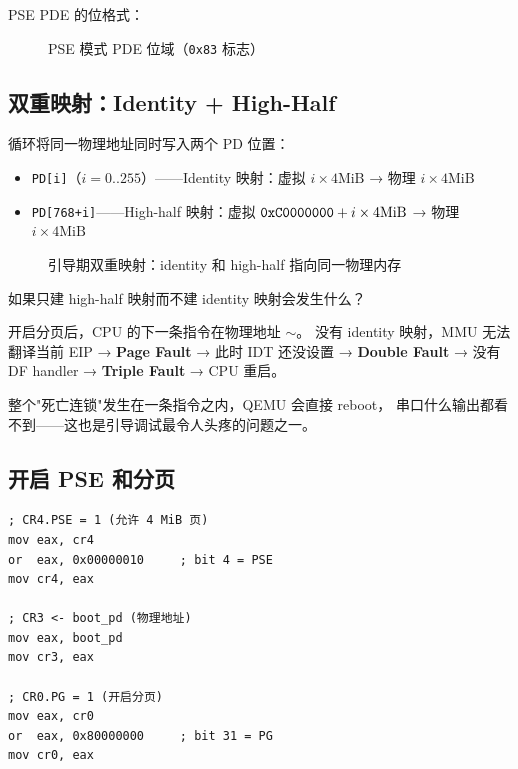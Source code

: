PSE PDE 的位格式：

\begin{figure}[H]
  \centering
  
  \caption{PSE 模式 PDE 位域（\texttt{0x83} 标志）}
  \label{fig:pse-pde-bits}
\end{figure}

\subsection{双重映射：Identity + High-Half}
\label{sec:dual-mapping}

循环将同一物理地址同时写入两个 PD 位置：

\begin{itemize}
  \item \texttt{PD[i]}（$i = 0..255$）——Identity 映射：虚拟 $i \times 4\text{MiB}$ → 物理 $i \times 4\text{MiB}$
  \item \texttt{PD[768+i]}——High-half 映射：虚拟 $\texttt{0xC0000000} + i \times 4\text{MiB}$ → 物理 $i \times 4\text{MiB}$
\end{itemize}

\begin{figure}[H]
  \centering
  
  \caption{引导期双重映射：identity 和 high-half 指向同一物理内存}
  \label{fig:dual-mapping}
\end{figure}

\begin{warnbox}
如果只建 high-half 映射而不建 identity 映射会发生什么？

开启分页后，CPU 的下一条指令在物理地址 $\sim$。
没有 identity 映射，MMU 无法翻译当前 EIP → \textbf{Page Fault} →
此时 IDT 还没设置 → \textbf{Double Fault} →
没有 DF handler → \textbf{Triple Fault} → CPU 重启。

整个"死亡连锁"发生在一条指令之内，QEMU 会直接 reboot，
串口什么输出都看不到——这也是引导调试最令人头疼的问题之一。
\end{warnbox}

\subsection{开启 PSE 和分页}

\begin{lstlisting}[style=nasmstyle]
; CR4.PSE = 1 (允许 4 MiB 页)
mov eax, cr4
or  eax, 0x00000010     ; bit 4 = PSE
mov cr4, eax

; CR3 <- boot_pd (物理地址)
mov eax, boot_pd
mov cr3, eax

; CR0.PG = 1 (开启分页)
mov eax, cr0
or  eax, 0x80000000     ; bit 31 = PG
mov cr0, eax
\end{lstlisting}

